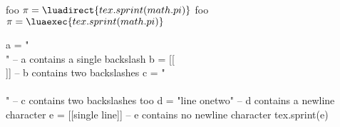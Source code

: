 \documentclass{article}
\begin{document}
foo $\pi = \luadirect{tex.sprint(math.pi)} $ \newline
foo $\pi = \luaexec{tex.sprint(math.pi)} $

\LuaCodeDebugOn %
\begin{luacode*}
a = "\\" -- a contains a single backslash
b = [[\\]] -- b contains two backslashes
c = "\\\\" -- c contains two backslashes too
d = "line one\nline two" -- d contains a newline character
e = [[single line]] -- e contains no newline character
tex.sprint(e)
\end{luacode*}
\LuaCodeDebugOff
\end{document}
